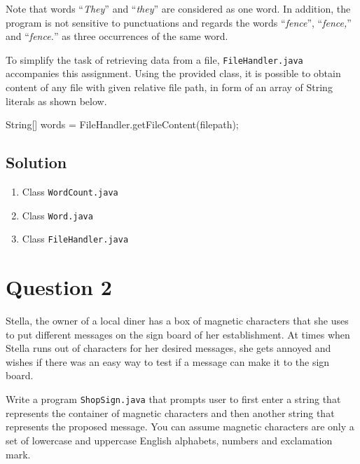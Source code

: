 \documentclass[12pt,letterpaper,twoside]{article}
\begin{document}
Note that words ``\textit{They}'' and ``\textit{they}'' are considered as one word.
In addition, the program is not sensitive to punctuations and regards the words ``\textit{fence}'', ``\textit{fence,}'' and ``\textit{fence.}'' as three occurrences of the same word.

To simplify the task of retrieving data from a file, \texttt{FileHandler.java} accompanies this assignment.
Using the provided class, it is possible to obtain content of any file with given relative file path, in form of an array of String literals as shown below.

\begin{terminal}
String[] words = FileHandler.getFileContent(filepath);
\end{terminal}

\subsection*{Solution}

\lstset{language=java}
\begin{enumerate}
	\item Class \texttt{WordCount.java}
	
	\item Class \texttt{Word.java}
	
	\item Class \texttt{FileHandler.java}
	
\end{enumerate}

\section*{Question 2}

Stella, the owner of a local diner has a box of magnetic characters that she uses to put different messages on the sign board of her establishment.
At times when Stella runs out of characters for her desired messages, she gets annoyed and wishes if there was an easy way to test if a message can make it to the sign board.

Write a program \texttt{ShopSign.java} that prompts user to first enter a string that represents the container of magnetic characters and then another string that represents the proposed message.
You can assume magnetic characters are only a set of lowercase and uppercase English alphabets, numbers and exclamation mark.
\end{document}
